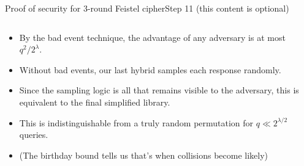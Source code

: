 \documentclass[aspectratio=169, lualatex, handout]{beamer}
\begin{document}
	\begin{frame}{Proof of security for 3-round Feistel cipher}{Step 11  (this content is optional)}
		\begin{columns}[c]
			\begin{column}{0.6\textwidth}
				\begin{itemize}
					\item By the bad event technique, the advantage of any adversary is at most $q^2/2^{\lambda}$.
					\item Without bad events, our last hybrid samples each response randomly.
					\item Since the sampling logic is all that remains visible to the adversary, this is equivalent to the final simplified library.
					\item This is indistinguishable from a truly random permutation for $q \ll 2^{\lambda/2}$ queries.
					\item (The birthday bound tells us that's when collisions become likely)
				\end{itemize}
			\end{column}
			\begin{column}{0.4\textwidth}
				\vspace{-1.5cm}
				\begin{center}
				\end{center}
			\end{column}
		\end{columns}
	\end{frame}
\end{document}
